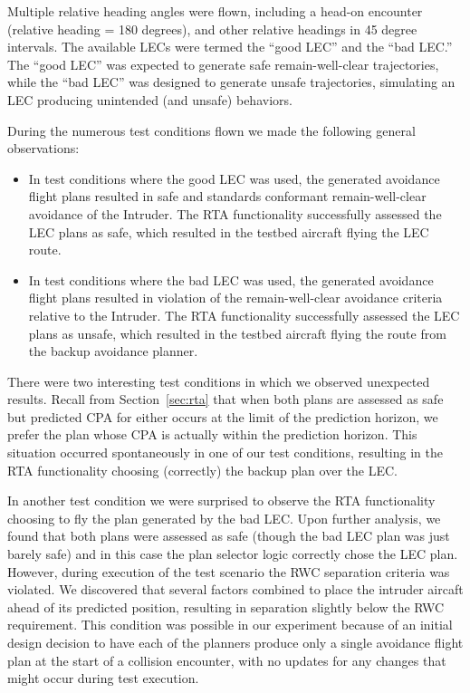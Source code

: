 Multiple relative heading angles were flown, including a head-on encounter (relative heading = 180 degrees), and other relative headings in 45 degree intervals.
The available LECs were termed the ``good LEC'' and the ``bad LEC.''  The ``good LEC'' was expected to generate safe remain-well-clear trajectories, while the ``bad LEC'' was designed to generate unsafe trajectories, simulating an LEC producing unintended (and unsafe) behaviors.  

During the numerous test conditions flown we made the following general observations:
\begin{itemize}
\item In test conditions where the good LEC was used, the generated avoidance flight plans resulted in safe and standards conformant remain-well-clear avoidance of the Intruder.  The RTA functionality successfully assessed the LEC plans as safe, which resulted in the testbed aircraft flying the LEC route.  
\item In test conditions where the bad LEC was used, the generated avoidance flight plans resulted in violation of the remain-well-clear avoidance criteria relative to the Intruder.  The RTA functionality successfully assessed the LEC plans as unsafe, which resulted in the testbed aircraft flying the route from the backup avoidance planner.  
\end{itemize}


There were two interesting test conditions in which we observed unexpected results.  Recall from Section~\ref{sec:rta} that when both plans are assessed as safe but predicted CPA for either occurs at the limit of the prediction horizon, we prefer the plan whose CPA is actually within the prediction horizon.  This situation occurred spontaneously in one of our test conditions, resulting in the RTA functionality choosing (correctly) the backup plan over the LEC.  

In another test condition we were surprised to observe the RTA functionality choosing to fly the plan generated by the bad LEC.  Upon further analysis, we found that both plans were assessed as safe (though the bad LEC plan was just barely safe) and in this case the plan selector logic correctly chose the LEC plan.  However, during execution of the test scenario the RWC separation criteria was violated.  We discovered that several factors combined to place the intruder aircaft ahead of its predicted position, resulting in separation slightly below the RWC requirement.  This condition was possible in our experiment because of an initial design decision to have each of the planners produce only a single avoidance flight plan at the start of a collision encounter, with no updates for any changes that might occur during test execution.  


